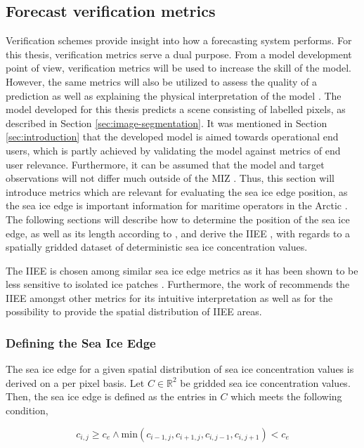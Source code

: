 \documentclass[../main/thesis.tex]{subfiles}
\begin{document}
\subsection{Forecast verification metrics}
Verification schemes provide insight into how a forecasting system performs. For this thesis, verification metrics serve a dual purpose. From a model development point of view, verification metrics will be used to increase the skill of the model. However, the same metrics will also be utilized to assess the quality of a prediction as well as explaining the physical interpretation of the model \citep{Casati2008}. The model developed for this thesis predicts a scene consisting of labelled pixels, as described in Section \ref{sec:image-segmentation}. It was mentioned in Section \ref{sec:introduction} that the developed model is aimed towards operational end users, which is partly achieved by validating the model against metrics of end user relevance. Furthermore, it can be assumed that the model and target observations will not differ much outside of the MIZ \citep{Fritzner2020}. Thus, this section will introduce metrics which are relevant for evaluating the sea ice edge position, as the sea ice edge is important information for maritime operators in the Arctic \citep{Melsom2019}. The following sections will describe how to determine the position of the sea ice edge, as well as its length according to \citet{Melsom2019}, and derive the IIEE \citep{Goessling2016}, with regards to a spatially gridded dataset of deterministic sea ice concentration values.

The IIEE is chosen among similar sea ice edge metrics \citep{Melsom2019, Dukhovskoy2015} as it has been shown to be less sensitive to isolated ice patches \citep{Palerme2019}. Furthermore, the work of \citet{Melsom2019} recommends the IIEE amongst other metrics for its intuitive interpretation as well as for the possibility to provide the spatial distribution of IIEE areas.

\subsubsection{Defining the Sea Ice Edge}
\label{sec:iceedgelength}
The sea ice edge for a given spatial distribution of sea ice concentration values is derived on a per pixel basis. Let $C \in{\mathbb{R}^2}$ be gridded sea ice concentration values. Then, the sea ice edge is defined as the entries in $C$ which meets the following condition,

\begin{equation}
    \label{eq:iceedge}
    c_{i,j} \geq c_e \wedge \text{min}{(c_{i-1,j},c_{i+1,j},c_{i,j-1},c_{i,j+1})} < c_e
\end{equation}
\end{document}
